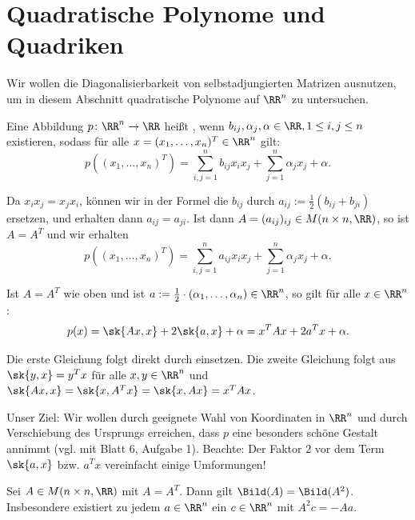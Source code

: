 \section{Quadratische Polynome und Quadriken}
\label{sec:2.8}

Wir wollen die Diagonalisierbarkeit von selbstadjungierten Matrizen ausnutzen, um in diesem Abschnitt quadratische Polynome auf $\RR^n$ zu untersuchen.

\begin{definition}
	\label{def:8.1}
	Eine Abbildung $p \colon \RR^n \rightarrow \RR$ heißt , wenn $b_{ij}, \alpha_j, \alpha \in \RR, 1 \leq i,j \leq n$ existieren, sodass für alle $x = (x_1,\dots,x_n)^T \in \RR^n$ gilt:
	\[
		p((x_1,\dots,x_n)^T) = \sum_{i,j=1}^{n} b_{ij} x_i x_j + \sum_{j=1}^{n} \alpha_j x_j + \alpha.
	\]
\end{definition}

Da $x_ix_j = x_jx_i$, können wir in der Formel die $b_{ij}$ durch $a_{ij} := \frac{1}{2}(b_{ij} + b_{ji})$ ersetzen, und erhalten dann $a_{ij} = a_{ji}$.
Ist dann $A = (a_{ij})_{ij} \in M(n \times n, \RR)$, so ist $A = A^T$ und wir erhalten
\[
	p((x_1,\dots,x_n)^T) = \sum_{i,j=1}^{n} a_{ij} x_i x_j + \sum_{j=1}^{n} \alpha_j x_j + \alpha.
\]

\begin{lemma}
	\label{lemma:8.2}
	Ist $A = A^T$ wie oben und ist $a := \frac{1}{2} \cdot (\alpha_1,\dots,\alpha_n) \in \RR^n$, so gilt für alle $x \in \RR^n$:
	\[
		p(x) = \sk{Ax,x} + 2 \sk{a,x} + \alpha = x^T A x + 2 a^T x + \alpha.
	\]
\end{lemma}

\begin{beweis}
	Die erste Gleichung folgt direkt durch einsetzen.
	Die zweite Gleichung folgt aus $\sk{y,x} = y^Tx$ für alle $x,y \in \RR^n$ und $\sk{Ax,x} = \sk{x,A^Tx} = \sk{x,Ax} = x^T Ax$. 
\end{beweis}

Unser Ziel: Wir wollen durch geeignete Wahl von Koordinaten in $\RR^n$ und durch Verschiebung des Ursprungs erreichen, dass $p$ eine besonders schöne Gestalt annimmt (vgl. mit Blatt 6, Aufgabe 1).
Beachte: Der Faktor $2$ vor dem Term $\sk{a,x}$ bzw. $a^Tx$ vereinfacht einige Umformungen!

\begin{lemma}
	\label{lemma:8.3}
	Sei $A \in M(n \times n,\RR)$ mit $A = A^T$.
	Dann gilt $\Bild(A) = \Bild(A^2)$.
	Insbesondere existiert zu jedem $a \in \RR^n$ ein $c \in \RR^n$ mit $A^2c = -Aa$.
\end{lemma}

